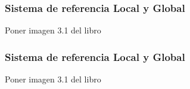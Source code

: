 \begin{frame}
    \frametitle{Sistema de referencia Local y Global}
    Poner imagen 3.1 del libro
\end{frame}


\begin{frame}
    \frametitle{Sistema de referencia Local y Global}
    Poner imagen 3.1 del libro
\end{frame}